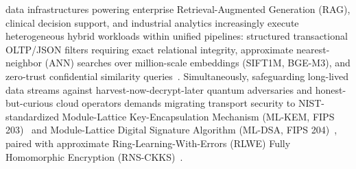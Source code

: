 \documentclass[10pt,journal,compsoc]{IEEEtran}
\begin{document}
\maketitle
\IEEEdisplaynontitleabstractindextext
\IEEEpeerreviewmaketitle

 data infrastructures powering enterprise Retrieval-Augmented Generation (RAG), clinical decision support, and industrial analytics increasingly execute heterogeneous hybrid workloads within unified pipelines: structured transactional OLTP/JSON filters requiring exact relational integrity, approximate nearest-neighbor (ANN) searches over million-scale embeddings (SIFT1M, BGE-M3), and zero-trust confidential similarity queries~\cite{wang2021milvus,malkov2020hnsw,chen2021spann,cooper2010ycsb,jegou2011sift,chen2024bgem3}. Simultaneously, safeguarding long-lived data streams against harvest-now-decrypt-later quantum adversaries and honest-but-curious cloud operators demands migrating transport security to NIST-standardized Module-Lattice Key-Encapsulation Mechanism (ML-KEM, FIPS 203)~\cite{nist_fips203_2024,stebila2016liboqs} and Module-Lattice Digital Signature Algorithm (ML-DSA, FIPS 204)~\cite{nist_fips204_2024}, paired with approximate Ring-Learning-With-Errors (RLWE) Fully Homomorphic Encryption (RNS-CKKS)~\cite{cheon2017ckks,albadawi2022openfhe}.
\end{document}
